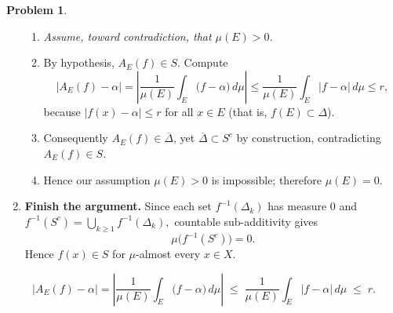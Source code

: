 \documentclass[12pt]{article}
\theoremstyle{definition} %
\newtheorem{problem}{Problem}
\theoremstyle{plain} %
\begin{document}
\begin{problem}
\begin{enumerate}
            \begin{enumerate}
                \item \textit{Assume, toward contradiction, that $\mu(E)>0$.}
                \item By hypothesis, $A_{E}(f)\in S$.
                      Compute
                      \[
                          \bigl|A_{E}(f)-\alpha\bigr|
                          =\left|
                              \frac{1}{\mu(E)}
                              \int_{E}\bigl(f-\alpha\bigr)\,d\mu
                            \right|
                          \le
                          \frac{1}{\mu(E)}
                          \int_{E}\bigl|f-\alpha\bigr|\,d\mu
                          \le r ,
                      \]
                      because $|f(x)-\alpha|\le r$ for all $x\in E$ 
                      (that is, $f(E)\subset\Delta$).
                \item Consequently $A_{E}(f)\in\overline{\Delta}$, 
                      yet $\overline{\Delta}\subset S^{c}$ by construction,
                      contradicting $A_{E}(f)\in S$.
                \item Hence our assumption $\mu(E)>0$ is impossible;
                      therefore $\mu(E)=0$.
            \end{enumerate}

      \item \textbf{Finish the argument.}
            Since each set $f^{-1}(\Delta_{k})$ has measure $0$ and
            \(
              f^{-1}(S^{c})
              =\displaystyle\bigcup_{k\ge1}f^{-1}(\Delta_{k}),
            \)
            countable sub-additivity gives
            \[
                \mu\bigl(f^{-1}(S^{c})\bigr)=0.
            \]
            Hence $f(x)\in S$ for $\mu$-almost every $x\in X$.
  \end{enumerate}
\end{problem}
\pagebreak
\[
\bigl|A_{E}(f)-\alpha\bigr|
      =\left|
          \frac{1}{\mu(E)}\int_{E}\bigl(f-\alpha\bigr)\,d\mu
        \right|
      \;\le\;
      \frac{1}{\mu(E)}\int_{E}\bigl|f-\alpha\bigr|\,d\mu
      \;\le\;
      r.
\]
\end{document}

